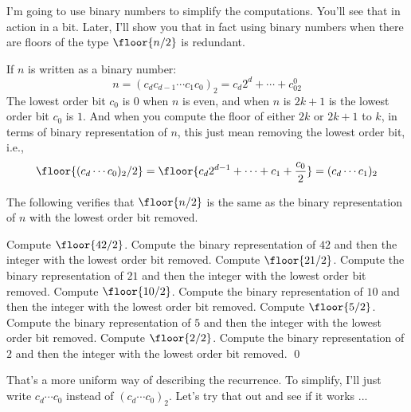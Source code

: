 I'm going to use binary numbers to simplify the computations.
You'll see that in action in a bit.
Later, I'll show you that in fact using binary numbers 
when there are floors of the type $\floor{n/2}$ is redundant.


If $n$ is written as a binary number:
\[
n = (c_d c_{d-1} \cdots c_1 c_0)_2 = c_d2^d + \cdots + c_02^0
\] 
The lowest order bit $c_0$ is 0 when $n$ is even,
and when $n$ is $2k + 1$ is the lowest
order bit $c_0$ is $1$.
And when you compute the floor of either $2k$ or $2k + 1$ to $k$,
in terms of binary representation of $n$, this just mean
removing the lowest order bit, i.e.,
\[
\floor{(c_d \cdots c_0)_2/2} 
= \floor{c_d2^{d-1} + \cdots + c_1 + \frac{c_0}{2}}
= (c_d \cdots c_1)_2
\]

\begin{ex} The following verifies that $\floor{n/2}$ is the same as the 
binary representation of $n$ with the lowest order bit removed.
\begin{itemize}
\li Compute $\floor{42/2}$. Compute the binary representation of $42$ and then the integer with the lowest order bit removed.
\li Compute $\floor{21/2}$. Compute the binary representation of $21$ and then the integer with the lowest order bit removed.
\li Compute $\floor{10/2}$. Compute the binary representation of $10$ and then the integer with the lowest order bit removed.
\li Compute $\floor{5/2}$. Compute the binary representation of $5$ and then the integer with the lowest order bit removed.
\li Compute $\floor{2/2}$. Compute the binary representation of $2$ and then the integer with the lowest order bit removed.
\qed
\end{itemize}

\end{ex}

That's a more uniform way of describing the recurrence.
To simplify, I'll just write 
$c_d \cdots c_0$ 
instead of 
$(c_d \cdots c_0)_2$. 
Let's try that out and see if it works ...

